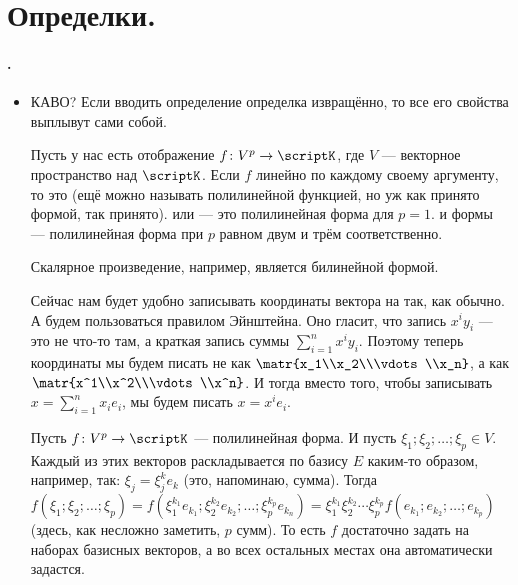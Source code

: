 \documentclass{article}
\begin{document}
\begin{itemize}
\begin{Proof}
        \end{Proof}
    \end{itemize}
    \section{Определки.}
    \paragraph{.}
    \begin{itemize}
        \item[]
        \begin{Comment}
            КАВО? Если вводить определение определка извращённо, то все его свойства выплывут сами собой.
        \end{Comment}
        \dfn Пусть у нас есть отображение $f\colon V^p\to\scriptK$, где $V$ --- векторное пространство над $\scriptK$. Если $f$ линейно по каждому своему аргументу, то это  (ещё можно называть полилинейной функцией, но уж как принято формой, так принято).
        \dfn {} или  --- это полилинейная форма для $p=1$.
        \dfn {} и  формы --- полилинейная форма при $p$ равном двум и трём соответственно.
        \begin{Example}
            Скалярное произведение, например, является билинейной формой.
        \end{Example}
        \begin{Comment}
            Сейчас нам будет удобно записывать координаты вектора на так, как обычно. А будем пользоваться правилом Эйнштейна. Оно гласит, что запись $x^iy_i$ --- это не что-то там, а краткая запись суммы $\sum\limits_{i=1}^nx^iy_i$. Поэтому теперь координаты мы будем писать не как $\matr{x_1\\x_2\\\vdots\\x_n}$, а как $\matr{x^1\\x^2\\\vdots\\x^n}$. И тогда вместо того, чтобы записывать $x=\sum\limits_{i=1}^nx_ie_i$, мы будем писать $x=x^ie_i$.
        \end{Comment}
        \thm Пусть $f\colon V^p\to\scriptK$ --- полилинейная форма. И пусть $\xi_1;\xi_2;\ldots;\xi_p\in V$. Каждый из этих векторов раскладывается по базису $E$ каким-то образом, например, так: $\xi_j=\xi_j^ke_k$ (это, напоминаю, сумма). Тогда $f(\xi_1;\xi_2;\ldots;\xi_p)=f(\xi_1^{k_1}e_{k_1};\xi_2^{k_2}e_{k_2};\ldots;\xi_p^{k_p}e_{k_n})=\xi_1^{k_1}\xi_2^{k_2}\cdots\xi_p^{k_p}f(e_{k_1};e_{k_2};\ldots;e_{k_p})$ (здесь, как несложно заметить, $p$ сумм). То есть $f$ достаточно задать на наборах базисных векторов, а во всех остальных местах она автоматически задастся.

\end{itemize}
\end{document}
